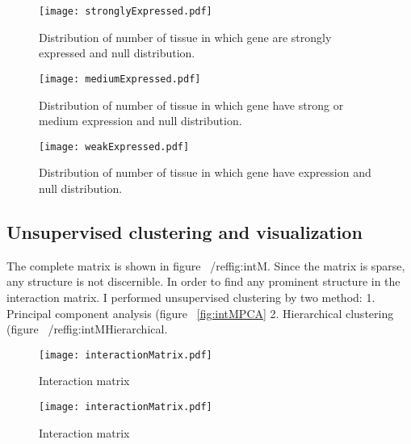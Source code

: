 \documentclass{article}
\begin{document}
\begin{figure}[ht]
	\begin{center}
		\texttt{[image: stronglyExpressed.pdf]}
	\end{center}
	\caption{ Distribution of number of tissue in which gene are strongly expressed and null distribution.}
	\label{fig:strongEx}
\end{figure}

\begin{figure}[ht]
	\begin{center}
		\texttt{[image: mediumExpressed.pdf]}
	\end{center}
	\caption{ Distribution of number of tissue in which gene have strong or medium expression and null distribution.}
	\label{fig:mediumEx}
\end{figure}

\begin{figure}[ht]
	\begin{center}
		\texttt{[image: weakExpressed.pdf]}
	\end{center}
	\caption{ Distribution of number of tissue in which gene have expression and null distribution.}
	\label{fig:weakEx}
\end{figure}


\subsection{Unsupervised clustering and visualization}

The complete matrix is shown in 
figure ~/ref{fig:intM}. Since the matrix is sparse, any structure is not discernible. 
In order to find any prominent structure in the interaction matrix. I performed unsupervised clustering by two method: 1. Principal component
analysis (figure ~\ref{fig:intMPCA} 2. Hierarchical clustering (figure ~/ref{fig:intMHierarchical}.


\begin{figure}[ht]
	\begin{center}
		\texttt{[image: interactionMatrix.pdf]}
	\end{center}
	\caption{Interaction matrix}
	\label{fig:intM}
\end{figure}


\begin{figure}[ht]
	\begin{center}
		\texttt{[image: interactionMatrix.pdf]}
	\end{center}
	\caption{Interaction matrix}
	\label{fig:intM}
\end{figure}
\end{document}
